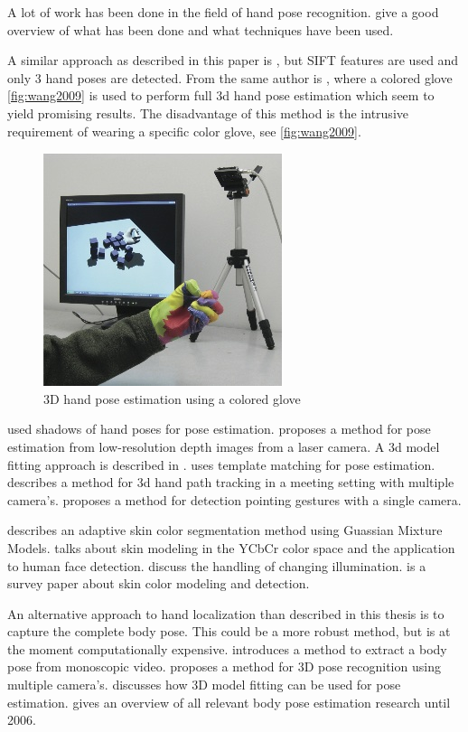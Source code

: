A lot of work has been done in the field of hand pose recognition. \citep{Erol2007,Mitra2007} give a good overview of what has been done and what techniques have been used.

A similar approach as described in this paper is \citep{Wang2007}, but SIFT features are used and only 3 hand poses are detected. From the same author is \citep{Wang2009}, where a colored glove \autoref{fig:wang2009} is used to perform full 3d hand pose estimation which seem to yield promising results. The disadvantage of this method is the intrusive requirement of wearing a specific color glove, see \autoref{fig:wang2009}.

\begin{figure}[tb]
	\center{}
	\includegraphics[width=0.4\linewidth]{figures/wang2009.jpg}
	\caption{3D hand pose estimation using a colored glove}
	\label{fig:wang2009}
\end{figure}

\citep{Segen1999} used shadows of hand poses for pose estimation. \citep{Mo2006} proposes a method for pose estimation from low-resolution depth images from a laser camera. A 3d model fitting approach is described in \citep{Athitsos2003,laGorce2010}. \citep{Stenger2006} uses template matching for pose estimation. \citep{Xiong2006} describes a method for 3d hand path tracking in a meeting setting with multiple camera's. \citep{Nickel2007} proposes a method for detection pointing gestures with a single camera.

\citep{Hassanpour2008} describes an adaptive skin color segmentation method using Guassian Mixture Models. \citep{Phung2002} talks about skin modeling in the YCbCr color space and the application to human face detection. \citep{Sigal2004,Soriano2000,Stoerring1999} discuss the handling of changing illumination. \citep{Kakumanu2007} is a survey paper about skin color modeling and detection.

An alternative approach to hand localization than described in this thesis is to capture the complete body pose. This could be a more robust method, but is at the moment computationally expensive. \citep{ferrari2008} introduces a method to extract a body pose from monoscopic video. \citep{VandenBergh2009} proposes a method for 3D pose recognition using multiple camera's. \citep{Poppe2007} discusses how 3D model fitting can be used for pose estimation. \citep{Moeslund2006} gives an overview of all relevant body pose estimation research until 2006.

